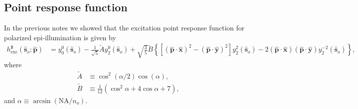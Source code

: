 \documentclass[11pt]{article}
\providecommand{\so}[1]{\mathbf{\hat{s}}_o}
\providecommand{\mh}[1]{\mathbf{\hat{#1}}}
\begin{document}
\subsection{Point response function}
In the previous notes we showed that the excitation point response function for
polarized epi-illumination is given by
\begin{align}
  h^{\mh{z}}_{\text{exc}}(\so{}; \mh{p}) &= y_0^0(\so{}) - \frac{1}{\sqrt{5}}\tilde{A}y_2^0(\so{}) + \sqrt{\frac{3}{5}}\tilde{B}\left\{[(\mh{p}\cdot\mh{x})^2 - (\mh{p}\cdot\mh{y})^2]y_2^2(\so{}) - 2(\mh{p}\cdot\mh{x})(\mh{p}\cdot\mh{y})y_2^{-2}(\so{})\right\}, \label{eq:genpsf}
\end{align}
where
\begin{subequations}
\begin{align}
  \tilde{A} &\equiv \cos^2(\alpha/2)\cos(\alpha),\\
  \tilde{B} &\equiv \frac{1}{12}(\cos^2\alpha + 4\cos\alpha + 7),
\end{align}\label{eq:coefficients}%
\end{subequations}
and $\alpha \equiv \arcsin(\text{NA}/n_o)$.
\end{document}
